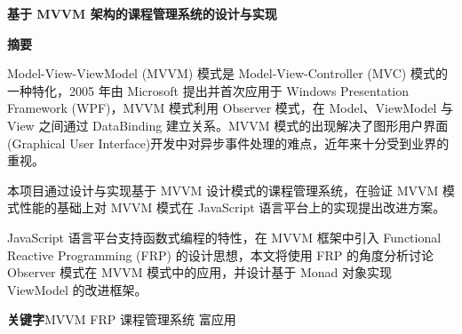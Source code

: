 \newpage
\begin{center}
	\heiti{}\textbf{基于 MVVM 架构的课程管理系统的设计与实现}
\end{center}
\begin{center}
	\heiti{}\textbf{摘\quad 要}
\end{center}
\vspace{2.5mm}
\songti{}

Model-View-ViewModel (MVVM) 模式是 Model-View-Controller (MVC) 模式的一种特化，2005 年由 Microsoft 提出并首次应用于 Windows Presentation Framework (WPF)，MVVM 模式利用 Observer 模式，在 Model、ViewModel 与 View 之间通过 DataBinding 建立关系。MVVM 模式的出现解决了图形用户界面(Graphical User Interface)开发中对异步事件处理的难点，近年来十分受到业界的重视。

本项目通过设计与实现基于 MVVM 设计模式的课程管理系统，在验证 MVVM 模式性能的基础上对 MVVM 模式在 JavaScript 语言平台上的实现提出改进方案。

JavaScript 语言平台支持函数式编程的特性，在 MVVM 框架中引入 Functional Reactive Programming (FRP) 的设计思想，本文将使用 FRP 的角度分析讨论 Observer 模式在 MVVM 模式中的应用，并设计基于 Monad 对象实现 ViewModel 的改进框架。

\vspace{3mm}
\heiti\textbf{关键字}\quad \songti MVVM \quad FRP \quad 课程管理系统 \quad 富应用

